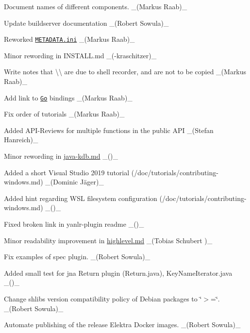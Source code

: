 \begin{DoxyItemize}
\item Document names of different components. \+\_\+(\+Markus Raab)\+\_\+
\item Update buildserver documentation \+\_\+(\+Robert Sowula)\+\_\+
\item Reworked \href{/home/jenkins/workspace/libelektra-release/doc/METADATA.ini}{\tt M\+E\+T\+A\+D\+A\+T\+A.\+ini} \+\_\+(\+Markus Raab)\+\_\+
\item Minor rewording in I\+N\+S\+T\+A\+L\+L.\+md \+\_\+({\itshape }-\/kraschitzer)\+\_\+
\item Write notes that {\ttfamily \textbackslash{}\textbackslash{}} are due to shell recorder, and are not to be copied \+\_\+(\+Markus Raab)\+\_\+
\item Add link to \href{https://github.com/ElektraInitiative/go-elektra}{\tt Go} bindings \+\_\+(\+Markus Raab)\+\_\+
\item Fix order of tutorials \+\_\+(\+Markus Raab)\+\_\+
\item Added A\+P\+I-\/\+Reviews for multiple functions in the public A\+PI \+\_\+(\+Stefan Hanreich)\+\_\+
\item Minor rewording in \hyperlink{doc_tutorials_java-kdb_md}{java-\/kdb.md} \+\_\+()\+\_\+
\item Added a short Visual Studio 2019 tutorial (/doc/tutorials/contributing-\/windows.md) \+\_\+(Dominic Jäger)\+\_\+
\item Added hint regarding W\+SL filesystem configuration (/doc/tutorials/contributing-\/windows.md) \+\_\+()\+\_\+
\item Fixed broken link in yanlr-\/plugin readme \+\_\+()\+\_\+
\item Minor readability improvement in \hyperlink{doc_tutorials_highlevel_md}{highlevel.md} \+\_\+(Tobias Schubert )\+\_\+
\item Fix examples of spec plugin. \+\_\+(\+Robert Sowula)\+\_\+
\end{DoxyItemize}


\begin{DoxyItemize}
\item Added small test for jna Return plugin ({\ttfamily Return.\+java}), {\ttfamily Key\+Name\+Iterator.\+java} \+\_\+()\+\_\+
\end{DoxyItemize}


\begin{DoxyItemize}
\item Change shlibs version compatibility policy of Debian packages to \char`\"{}$>$=\char`\"{}. \+\_\+(\+Robert Sowula)\+\_\+
\item Automate publishing of the release Elektra Docker images. \+\_\+(\+Robert Sowula)\+\_\+
\end{DoxyItemize}


